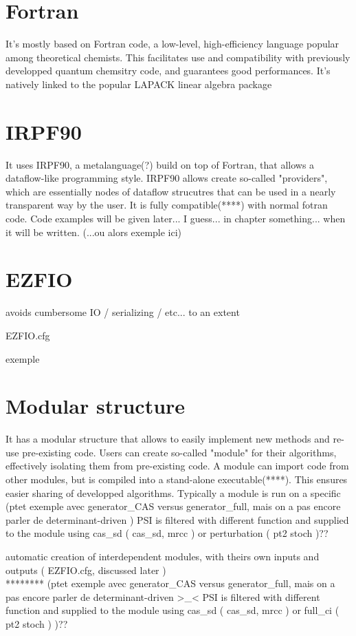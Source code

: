 


\section{Fortran}
It's mostly based on Fortran code, a low-level, high-efficiency language popular among theoretical chemists. This facilitates use and compatibility with previously developped quantum chemsitry code, and guarantees good performances. It's natively linked to the popular LAPACK linear algebra package

\section{IRPF90}
It uses IRPF90, a metalanguage(?) build on top of Fortran, that allows a dataflow-like programming style.
IRPF90 allows create so-called "providers", which are essentially nodes of dataflow strucutres that can be used in a nearly transparent way by the user. It is fully compatible(****) with normal fotran code. Code examples will be given later... I guess... in chapter something... when it will be written.
(...ou alors exemple ici)


\section{EZFIO}


avoids cumbersome IO / serializing / etc... to an extent

EZFIO.cfg

exemple

\section{Modular structure}

It has a modular structure that allows to easily implement new methods and re-use pre-existing code.
Users can create so-called "module" for their algorithms, effectively isolating them from pre-existing code. A module can import code from other modules, but is compiled into a stand-alone executable(****). This ensures easier sharing of developped algorithms.
Typically a module is run on a specific 
(ptet exemple avec generator\_CAS versus generator\_full, mais on a pas encore parler de determinant-driven )
PSI is filtered with different function and supplied to the module using cas\_sd ( cas\_sd, mrcc ) or perturbation ( pt2 stoch )??

automatic creation of interdependent modules, with theirs own inputs and outputs ( EZFIO.cfg, discussed later ) \\
******** (ptet exemple avec generator\_CAS versus generator\_full, mais on a pas encore parler de determinant-driven >\_< PSI is filtered with different function and supplied to the module using cas\_sd ( cas\_sd, mrcc ) or full\_ci ( pt2 stoch ) )?? \\

